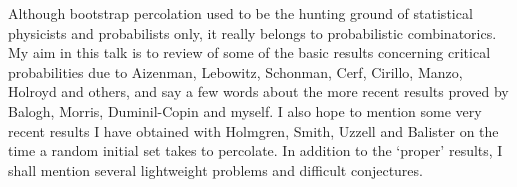 \documentclass{article}
\begin{document}
\vspace{10pt}
\noindent
Although bootstrap percolation used to be the hunting ground of statistical
physicists and probabilists only, it really belongs to probabilistic combinatorics.
My aim in this talk is to review of some of the basic results concerning
critical probabilities due to Aizenman, Lebowitz, Schonman, Cerf, Cirillo,
Manzo, Holroyd and others, and say a few words about the more recent results
proved by Balogh, Morris, Duminil-Copin and myself. I also hope to mention
some very recent results I have obtained with Holmgren, Smith, Uzzell and Balister
on the time a random initial set takes to percolate. In addition to the `proper'
results, I shall mention several lightweight problems and difficult conjectures.


%
%
%
%
%
%
%
%
%
%
%
\end{document}
